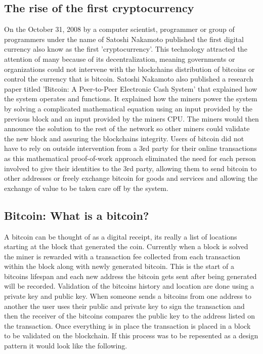 \subsection{The rise of the first cryptocurrency}
On the October 31, 2008 by a computer scientist, programmer or group of programmers under the name of Satoshi Nakamoto published the first digital currency also know as the first 'cryptocurrency'. This technology attracted the attention of many because of its decentralization, meaning governments or organizations could not intervene with the blockchains distribution of bitcoins or control the currency that is bitcoin. Satoshi Nakamoto also published a research paper titled \cite{Satoshi}'Bitcoin: A Peer-to-Peer Electronic Cash System' that explained how the system operates and functions. It explained how the miners power the system by solving a complicated mathematical equation using an input provided by the previous block and an input provided by the miners CPU. The miners would then announce the solution to the rest of the network so other miners could validate the new block and assuring the blockchains integrity. Users of bitcoin did not have to rely on outside intervention from a 3rd party for their online transactions as this mathematical proof-of-work approach eliminated the need for each person involved to give their identities to the 3rd party, allowing them to send bitcoin to other addresses or freely exchange bitcoin for goods and services and allowing the exchange of value to be taken care off by the system.

\subsection{Bitcoin: What is a bitcoin?}
A bitcoin can be thought of as a digital receipt, its really a list of locations starting at the block that generated the coin. Currently when a block is solved the miner is rewarded with a transaction fee collected from each transaction within the block along with newly generated bitcoin. This is the start of a bitcoins lifespan and each new address the bitcoin gets sent after being generated will be recorded. Validation of the bitcoins history and location are done using a private key and public key. When someone sends a bitcoins from one address to another the user uses their public and private key to sign the transaction and then the receiver of the bitcoins compares the public key to the address listed on the transaction. Once everything is in place the transaction is placed in a block to be validated on the blockchain. If this process was to be repesented as a design pattern it would look like the following.

